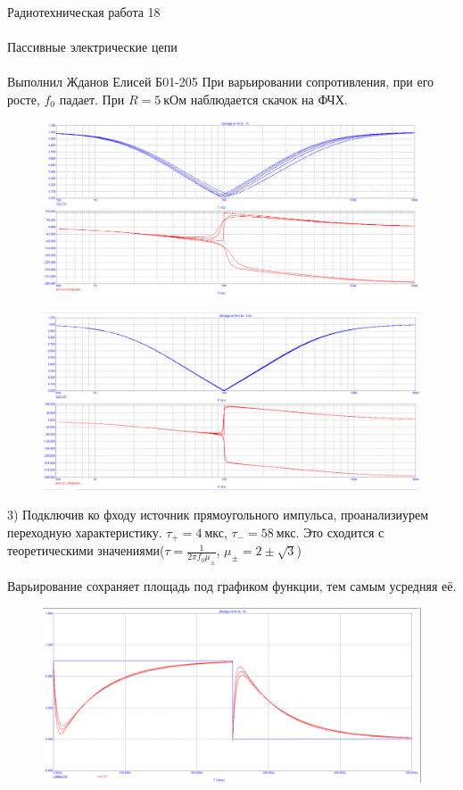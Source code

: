 \documentclass{astroedu-lab}
\begin{document}
\begin{problem}{\huge Радиотехническая работа 18\\\\Пассивные электрические цепи\\\\Выполнил Жданов Елисей Б01-205}
При варьировании сопротивления, при его росте, $f_0$ падает. При $R = 5 \: \textit{кОм}$ наблюдается скачок на ФЧХ.

\begin{figure}[!h]
	\centering
	\includegraphics[width=1\textwidth]{3_7.png}
	\label{fig:boiler}
\end{figure}

\newpage

\begin{figure}[!h]
	\centering
	\includegraphics[width=1\textwidth]{3_8.png}
	\label{fig:boiler}
\end{figure}

3) Подключив ко фходу источник прямоугольного импульса, проанализиурем переходную характеристику. $\tau_+ = 4 \: \text{мкс}$, $\tau_- = 58 \: \text{мкс}$. Это сходится с теоретическими значениями($\tau = \frac{1}{2 \pi f_0 \mu_{\pm}}$, $\mu_{\pm} = 2 \pm \sqrt{3}$)

Варьирование сохраняет площадь под графиком функции, тем самым усредняя её.

\begin{figure}[!h]
	\centering
	\includegraphics[width=1\textwidth]{3_9.png}
	\label{fig:boiler}
\end{figure}


\end{problem}
\end{document}
